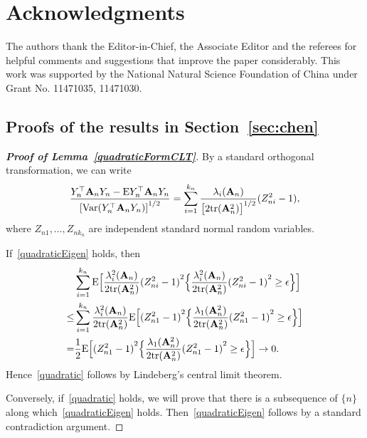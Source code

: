 \documentclass[times,sort&compress,3p]{elsarticle}
\newcommand{\mytr}{ {\rm tr} }
\newcommand{\myE}{ {\rm E} }
\newcommand{\myVar}{ {\rm Var} }
\newcommand{\BA}{\mathbf{A}}    \newcommand{\BB}{\mathbf{B}}    \newcommand{\BC}{\mathbf{C}}    \newcommand{\BD}{\mathbf{D}}    \newcommand{\BE}{\mathbf{E}}    \newcommand{\BF}{\mathbf{F}}    \newcommand{\BG}{\mathbf{G}}    \newcommand{\BH}{\mathbf{H}}    \newcommand{\BI}{\mathbf{I}}    \newcommand{\BJ}{\mathbf{J}}    \newcommand{\BK}{\mathbf{K}}    \newcommand{\BL}{\mathbf{L}}
\theoremstyle{plain}
\theoremstyle{definition}
\theoremstyle{remark}
\begin{document}
\section*{Acknowledgments}
The authors thank the Editor-in-Chief, the Associate Editor and the referees for helpful comments and suggestions that improve the paper considerably.
This work was supported by the National Natural Science Foundation of China under Grant No. 11471035, 11471030.
\begin{appendices}
    \section{Proofs of the results in Section~\ref{sec:chen}}\label{appendixA}
\begin{proof}[\textbf{Proof of Lemma~\ref{quadraticFormCLT}}]
    By a standard orthogonal transformation, we can write
    \begin{equation*}
        \frac{Y_n^\top  \BA_n Y_n-\myE Y_n^\top  \BA_n Y_n}{{[\myVar(Y_n^\top  \BA_n Y_n)]}^{1/2}}=\sum_{i=1}^{k_n}\frac{\lambda_i(\BA_n)}{{\big[2\mytr(\BA_n^2)\big]}^{1/2}}(Z_{ni}^2-1),
    \end{equation*}
    where $Z_{n1},\ldots,Z_{n k_n}$ are independent standard normal random variables.

    If~\ref{quadraticEigen} holds, then
    \begin{equation*}
        \begin{aligned}
            &\sum_{i=1}^{k_n}\myE\Big[\frac{\lambda_i^2(\BA_n)}{2\mathrm{tr}(\BA_n^2)}{(Z_{ni}^2-1)}^2\Big\{\frac{\lambda_i^2(\BA_n)}{2\mathrm{tr}(\BA_n^2)}{(Z_{ni}^2-1)}^2\geq \epsilon\Big\}\Big]\\
            \leq&\sum_{i=1}^{k_n}
            \frac{\lambda_i^2(\BA_n)}{2\mytr(\BA_n^2)}
            \myE\Big[{(Z_{n1}^2-1)}^2\Big\{\frac{\lambda_{1}(\BA_n^2)}{2\mytr(\BA_n^2)}{(Z_{n1}^2-1)}^2\geq \epsilon\Big\}\Big]\\
            =&
            \frac{1}{2}\myE\Big[{(Z_{n1}^2-1)}^2\Big\{\frac{\lambda_{1}(\BA_n^2)}{2\mytr(\BA_n^2)}{(Z_{n1}^2-1)}^2\geq \epsilon\Big\}\Big]\to 0.
        \end{aligned}
    \end{equation*}
    Hence~\ref{quadratic} follows by Lindeberg's central limit theorem.

    Conversely, if~\ref{quadratic} holds, we will prove that there is a subsequence of $\{n\}$ along which~\ref{quadraticEigen} holds. Then~\ref{quadraticEigen} follows by a standard contradiction argument. 


\end{proof}
\end{appendices}
\end{document}
